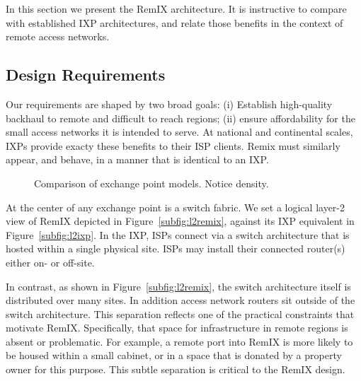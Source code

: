 In this section we present the RemIX architecture. It is instructive to compare with established IXP architectures, and relate those benefits in the context of remote access networks.

\subsection{Design Requirements}

Our requirements are shaped by two broad goals: (i) Establish high-quality
backhaul to remote and difficult to reach regions; (ii) ensure affordability
for the small access networks it is intended to serve. At national and
continental scales, IXPs provide exacty these benefits to their ISP clients. Remix must similarly appear, and behave, in a manner that is identical to an IXP.

\begin{figure*}
   \hfill
   \hfill
  \subfloat[RemIX]{
    \resizebox{0.6\columnwidth}{!}{
      \begin{tikzpicture}
        \ixboxesC
      \end{tikzpicture}
      \label{fig:ixbC}
    }
  }
  \caption{Comparison of exchange point models. Notice density.}
  \label{fig:ixb}
\end{figure*}

At the center of any exchange point is a switch fabric. We set a logical layer-2
view of RemIX depicted in Figure~\ref{subfig:l2remix}, against its IXP
equivalent in Figure~\ref{subfig:l2ixp}. In the IXP, ISPs connect via a switch
architecture that is hosted within a single physical site. ISPs may install
their connected router(s) either on- or off-site.

In contrast, as shown in Figure~\ref{subfig:l2remix}, the switch architecture
itself is distributed over many sites. In addition access network routers sit
outside of the switch architecture. This separation reflects one of the
practical constraints that motivate RemIX. Specifically, that space for
infrastructure in remote regions is absent or problematic. For example, a remote
port into RemIX is more likely to be housed within a small cabinet, or in a
space that is donated by a property owner for this purpose. This subtle separation is critical to the RemIX design. 


